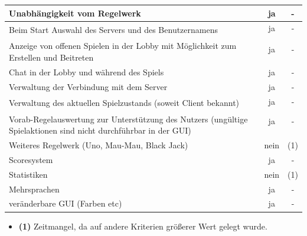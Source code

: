 \documentclass{article}
\begin{document}
\begin{tabular}{|l|c|c|}
   Unabhängigkeit vom Regelwerk & ja & - \\ \hline
   \multirow{2}{80mm}{Beim Start Auswahl des Servers und des Benutzernamens} & ja & - \\ & & \\ \hline
   \multirow{2}{80mm}{Anzeige von offenen Spielen in der Lobby mit Möglichkeit zum Erstellen und Beitreten} & ja & - \\ & & \\ \hline
   Chat in der Lobby und während des Spiels & ja & - \\ \hline
   Verwaltung der Verbindung mit dem Server & ja & - \\ \hline
  \multirow{2}{80mm}{Verwaltung des aktuellen Spielzustands (soweit Client bekannt)} & ja & - \\ & & \\ \hline
  \multirow{3}{80mm}{Vorab-Regelauswertung zur Unterstützung des Nutzers (ungültige Spielaktionen sind nicht durchführbar in der GUI)} & ja & - \\ & & \\ & & \\ \hline \hline
   Weiteres Regelwerk (Uno, Mau-Mau, Black Jack) & nein & (1) \\ \hline
   Scoresystem & ja & - \\ \hline
   Statistiken & nein & (1) \\ \hline
   Mehrsprachen & ja & - \\ \hline
   veränderbare GUI (Farben etc) & ja & - \\ \hline
\end{tabular}

\begin{itemize}
	\item \textbf{(1)} Zeitmangel, da auf andere Kriterien größerer Wert gelegt wurde. \\
\end{itemize}
\end{document}
